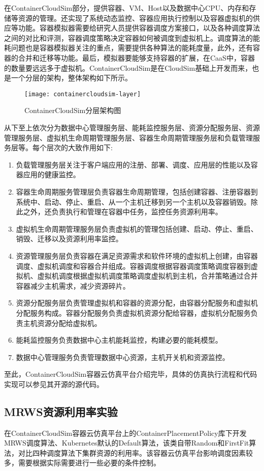 在ContainerCloudSim部分，提供容器、VM、Host以及数据中心CPU、内存和存储等资源的管理。还实现了系统动态监控、容器应用执行控制以及容器虚拟机的供应等功能。容器模拟器需要给研究人员提供容器调度方案接口，以及各种调度算法之间的对比和评测，容器调度策略决定容器如何被调度到虚拟机上。调度算法的能耗问题也是容器模拟器关注的重点，需要提供各种算法的能耗度量，此外，还有容器的合并和迁移等功能。最后，模拟器要能够支持容器的扩展，在CaaS中，容器的数量要远远多于虚拟机。ContainerCloudSim是在CloudSim基础上开发而来，也是一个分层的架构，整体架构如下所示。
\begin{figure}[H] %
	\centering
	\texttt{[image: containercloudsim-layer]}
	\caption{ContainerCloudSim分层架构图~\cite{Piraghaj2016ContainerCloudSim}}
\end{figure}
从下至上依次分为数据中心管理服务层、能耗监控服务层、资源分配服务层、资源管理服务层、虚拟机生命周期管理服务层、容器生命周期管理服务层和负载管理服务层等。每个层次的大致作用如下:
\begin{enumerate}
	\item 负载管理服务层关注于客户端应用的注册、部署、调度、应用层的性能以及容器应用的健康监控。
	\item 容器生命周期服务管理层负责容器生命周期管理，包括创建容器、注册容器到系统中、启动、停止、重启、从一个主机迁移到另一个主机以及容器销毁。除此之外，还负责执行和管理在容器中任务，监控任务资源利用率。
	\item 虚拟机生命周期管理服务层负责虚拟机的管理包括创建、启动、停止、重启、销毁、迁移以及资源利用率监控。
	\item 资源管理服务层负责容器在满足资源需求和软件环境的虚拟机上创建，由容器调度、虚拟机调度和容器合并组成。容器调度根据容器调度策略调度容器到虚拟机、虚拟机调度根据虚拟机调度策略调度虚拟机到主机，合并策略通过合并容器减少主机需求，减少资源碎片。
	\item 资源分配服务层负责管理虚拟机和容器的资源分配，由容器分配服务和虚拟机分配服务构成。容器分配服务负责虚拟机资源分配给容器，虚拟机分配服务负责主机资源分配给虚拟机。
	\item 能耗监控服务负责数据中心主机能耗监控，构建必要的能耗模型。
	\item 数据中心管理服务负责管理数据中心资源，主机开关机和资源监控。
\end{enumerate}
至此，ContainerCloudSim容器云仿真平台介绍完毕，具体的仿真执行流程和代码实现可以参见其开源的源代码。

\subsection{MRWS资源利用率实验}
在ContainerCloudSim容器云仿真平台上的ContainerPlacementPolicy库下开发MRWS调度算法、Kubernetes默认的Default算法，该类自带Random和FirstFit算法，对比四种调度算法下集群资源的利用率。该容器云仿真平台影响调度因素较多，需要根据实际需要进行一些必要的条件控制。

